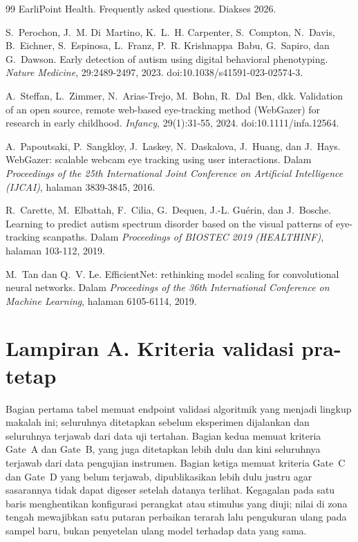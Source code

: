 \documentclass{article}
\begin{document}
\begin{thebibliography}{99}
EarliPoint Health. Frequently asked questions. Diakses 2026.

S.~Perochon, J.~M. Di~Martino, K.~L.~H. Carpenter, S.~Compton, N.~Davis, B.~Eichner,
S.~Espinosa, L.~Franz, P.~R. Krishnappa~Babu, G.~Sapiro, dan G.~Dawson. Early detection of
autism using digital behavioral phenotyping. \emph{Nature Medicine}, 29:2489-2497, 2023.
doi:10.1038/s41591-023-02574-3.

A.~Steffan, L.~Zimmer, N.~Arias-Trejo, M.~Bohn, R.~Dal~Ben, dkk. Validation of an
open source, remote web-based eye-tracking method (WebGazer) for research in early
childhood. \emph{Infancy}, 29(1):31-55, 2024. doi:10.1111/infa.12564.

A.~Papoutsaki, P.~Sangkloy, J.~Laskey, N.~Daskalova, J.~Huang, dan J.~Hays. WebGazer:
scalable webcam eye tracking using user interactions. Dalam \emph{Proceedings of the
25th International Joint Conference on Artificial Intelligence (IJCAI)}, halaman
3839-3845, 2016.

R.~Carette, M.~Elbattah, F.~Cilia, G.~Dequen, J.-L. Gu\'erin, dan J.~Bosche. Learning to
predict autism spectrum disorder based on the visual patterns of eye-tracking scanpaths.
Dalam \emph{Proceedings of BIOSTEC 2019 (HEALTHINF)}, halaman 103-112, 2019.

M.~Tan dan Q.~V. Le. EfficientNet: rethinking model scaling for convolutional neural
networks. Dalam \emph{Proceedings of the 36th International Conference on Machine Learning},
halaman 6105-6114, 2019.

\end{thebibliography}
\normalsize

\newpage
\appendix
\section*{Lampiran A. Kriteria validasi pra-tetap}

Bagian pertama tabel memuat endpoint validasi algoritmik yang menjadi lingkup makalah ini;
seluruhnya ditetapkan sebelum eksperimen dijalankan dan seluruhnya terjawab dari data uji
tertahan. Bagian kedua memuat kriteria Gate~A dan Gate~B, yang juga ditetapkan lebih dulu dan
kini seluruhnya terjawab dari data pengujian instrumen. Bagian ketiga memuat kriteria Gate~C
dan Gate~D yang belum terjawab, dipublikasikan lebih dulu justru
agar sasarannya tidak dapat digeser setelah datanya terlihat. Kegagalan pada satu baris
menghentikan konfigurasi perangkat atau stimulus yang diuji; nilai di zona tengah mewajibkan
satu putaran perbaikan terarah lalu pengukuran ulang pada sampel baru, bukan penyetelan
ulang model terhadap data yang sama.
\end{document}
